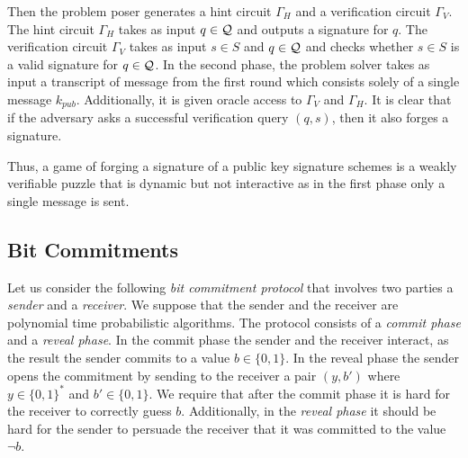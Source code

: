 Then the problem poser generates a hint circuit $\Gamma_H$ and a verification circuit $\Gamma_V$.
The hint circuit $\Gamma_H$ takes as input $q \in \mathcal{Q}$ and outputs a signature for $q$. The verification circuit
$\Gamma_V$ takes as input $s \in S$ and $q \in \mathcal{Q}$ and checks whether $s \in S$ is a valid signature for $q \in \mathcal{Q}$.
In the second phase, the problem solver takes as input a transcript of message from the first round which consists solely of a single message $k_{pub}$.
Additionally, it is given oracle access to $\Gamma_V$ and $\Gamma_H$.
It is clear that if the adversary asks a successful verification query $(q,s)$,
then it also forges a signature.

Thus, a game of forging a signature of a public key signature schemes is a weakly verifiable puzzle that
is dynamic but not interactive as in the first phase only a single message is sent.
%
\subsection{Bit Commitments}
Let us consider the following \textit{bit commitment protocol} that involves two parties a \textit{sender} and a \textit{receiver}.
We suppose that the sender and the receiver are polynomial time probabilistic algorithms.
The protocol consists of a \textit{commit phase} and a \textit{reveal phase}.
In the commit phase the sender and the receiver interact, as the result the sender commits to a value $b \in \{0,1\}$.
In the reveal phase the sender opens the commitment by sending to the receiver a pair $(y,b')$ where $y \in \{0,1\}^{*}$ and $b' \in \{0,1\}$.
We require that after the commit phase it is hard for the receiver to correctly guess $b$. Additionally, in the \textit{reveal phase}
it should be hard for the sender to persuade the receiver that it was committed to the value $\lnot b$.

